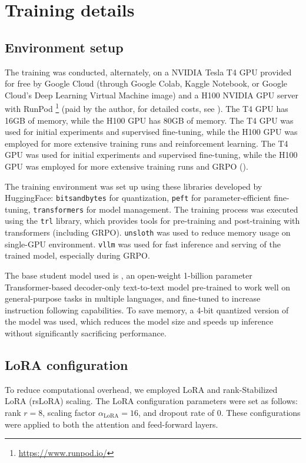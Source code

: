\section{Training details} \label{app:training-details}

\subsection{Environment setup}
The training was conducted, alternately, on a NVIDIA Tesla T4 GPU provided for free by Google Cloud (through Google Colab, Kaggle Notebook, or Google Cloud's Deep Learning Virtual Machine image) and a H100 NVIDIA GPU server with RunPod \footnote{\url{https://www.runpod.io/}} (paid by the author, for detailed costs, see ). The T4 GPU has 16GB of memory, while the H100 GPU has 80GB of memory. The T4 GPU was used for initial experiments and supervised fine-tuning, while the H100 GPU was employed for  more extensive training runs and reinforcement learning. The T4 GPU was used for initial experiments and supervised fine-tuning, while the H100 GPU was employed for more extensive training runs and GRPO ().

The training environment was set up using these libraries developed by HuggingFace: \verb|bitsandbytes| for quantization, \verb|peft| for parameter-efficient fine-tuning, \verb|transformers| for model management. The training process was executed using the \verb|trl| library, which provides tools for pre-training and post-training with transformers (including GRPO). \verb|unsloth| was used to reduce memory usage on single-GPU environment. \verb|vllm| was used for fast inference and serving of the trained model, especially during GRPO.

The base student model used is \studentmodel, an open-weight 1-billion parameter Transformer-based decoder-only text-to-text model pre-trained to work well on general-purpose tasks in multiple languages, and fine-tuned to increase instruction following capabilities. To save memory, a 4-bit quantized version of the model was used, which reduces the model size and speeds up inference without significantly sacrificing performance.

\subsection{LoRA configuration} \label{app:lora-config}

To reduce computational overhead, we employed LoRA \citep{huLoRALowRankAdaptation2021} and rank-Stabilized LoRA (rsLoRA) scaling. The LoRA configuration parameters were set as follows: rank \( r = 8 \), scaling factor \( \alpha_{\text{LoRA}} = 16 \), and dropout rate of 0. These configurations were applied to both the attention and feed-forward layers.

